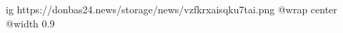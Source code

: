  
 
 
 
 

\ifcmt
  ig https://donbas24.news/storage/news/vzfkrxaisqku7tai.png
  @wrap center
  @width 0.9
\fi
